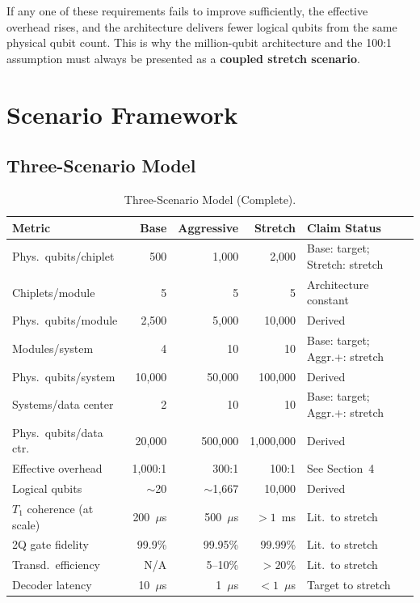 \documentclass[conference]{IEEEtran}
\begin{document}
If any one of these requirements fails to improve sufficiently, the effective overhead rises, and the architecture delivers fewer logical qubits from the same physical qubit count. This is why the million-qubit architecture and the 100:1 assumption must always be presented as a \textbf{coupled stretch scenario}.

\section{Scenario Framework}

\subsection{Three-Scenario Model}

\begin{table}[htbp]
\centering
\caption{Three-Scenario Model (Complete).}
\label{tab:three_scenario}
\begin{tabular}{lrrrp{3cm}}
\toprule
\textbf{Metric} & \textbf{Base} & \textbf{Aggressive} & \textbf{Stretch} & \textbf{Claim Status} \\
\midrule
Phys.\ qubits/chiplet & 500 & 1,000 & 2,000 & Base: target; Stretch: stretch \\
Chiplets/module & 5 & 5 & 5 & Architecture constant \\
Phys.\ qubits/module & 2,500 & 5,000 & 10,000 & Derived \\
Modules/system & 4 & 10 & 10 & Base: target; Aggr.+: stretch \\
Phys.\ qubits/system & 10,000 & 50,000 & 100,000 & Derived \\
Systems/data center & 2 & 10 & 10 & Base: target; Aggr.+: stretch \\
Phys.\ qubits/data ctr. & 20,000 & 500,000 & 1,000,000 & Derived \\
Effective overhead & 1,000:1 & 300:1 & 100:1 & See Section~4 \\
Logical qubits & ${\sim}$20 & ${\sim}$1,667 & 10,000 & Derived \\
$T_1$ coherence (at scale) & 200~$\mu$s & 500~$\mu$s & $> 1$~ms & Lit.\ to stretch \\
2Q gate fidelity & 99.9\% & 99.95\% & 99.99\% & Lit.\ to stretch \\
Transd.\ efficiency & N/A & 5--10\% & $> 20\%$ & Lit.\ to stretch \\
Decoder latency & 10~$\mu$s & 1~$\mu$s & $< 1$~$\mu$s & Target to stretch \\
\bottomrule
\end{tabular}
\end{table}
\end{document}
